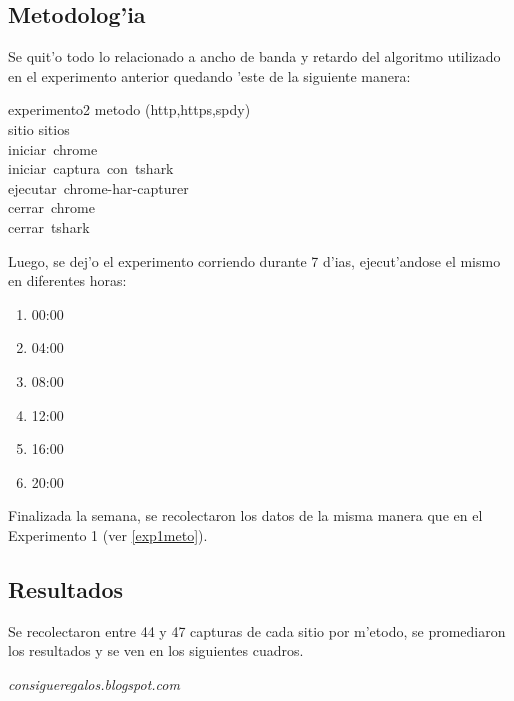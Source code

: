 \documentclass[a4paper,11pt,twocolumn]{article}
\begin{document}
\subsection{Metodolog'ia}

Se quit'o todo lo relacionado a ancho de banda y retardo del algoritmo utilizado en el experimento anterior quedando 'este de la siguiente manera:

\begin{pseudocode}{experimento2}{ }
\FOR metodo \in (http,https,spdy) \DO \\
\BEGIN
	\FOR sitio \in sitios \DO \\
	\BEGIN
		iniciar\ chrome\\
		iniciar\ captura\ con\ tshark\\
		ejecutar\ chrome-har-capturer\\
		cerrar\ chrome\\
		cerrar\ tshark
	\END
\END
\end{pseudocode}

Luego, se dej'o el experimento corriendo durante 7 d'ias, ejecut'andose el mismo en diferentes horas:

\begin{enumerate}
\item 00:00
\item 04:00
\item 08:00
\item 12:00
\item 16:00
\item 20:00
\end{enumerate}

Finalizada la semana, se recolectaron los datos de la misma manera que en el Experimento 1 (ver \ref{exp1meto}).

\subsection{Resultados}

Se recolectaron entre 44 y 47 capturas de cada sitio por m'etodo, se promediaron los resultados y se ven en los siguientes cuadros. 
\vspace*{2\baselineskip}

\emph{consigueregalos.blogspot.com}
\end{document}
